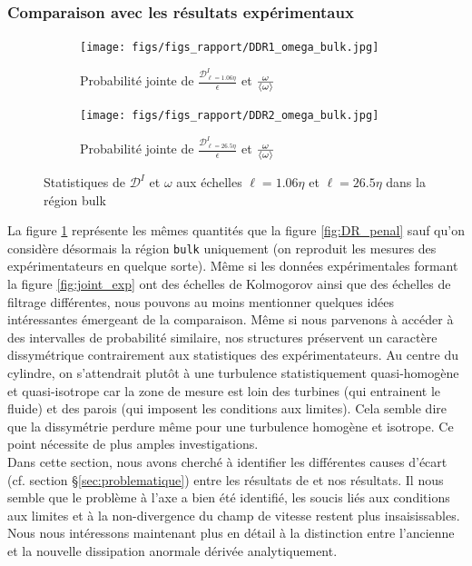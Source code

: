 \documentclass[13pt, a4paper]{extarticle}
\begin{document}
\subsubsection{Comparaison avec les résultats expérimentaux}\label{sec:res_exp} %
\begin{figure}[H]
  \centering
  \begin{subfigure}[b]{0.48\linewidth}
  \centering
  \texttt{[image: figs/figs\_rapport/DDR1\_omega\_bulk.jpg]}
  \caption{Probabilité jointe de $\frac{\mathscr{D}^I_{\ell=1.06\eta}}{\epsilon}$ 
  et $\frac{\omega}{\left\langle \omega\right\rangle}$}
  \end{subfigure}
  \begin{subfigure}[b]{0.48\linewidth}
    \centering
    \texttt{[image: figs/figs\_rapport/DDR2\_omega\_bulk.jpg]}
    \caption{Probabilité jointe de $\frac{\mathscr{D}^I_{\ell=26.5\eta}}{\epsilon}$ 
    et $\frac{\omega}{\left\langle \omega\right\rangle}$}
    \end{subfigure}
  \caption{Statistiques de $\mathscr{D}^I$ et $\omega$ aux échelles $\ell=1.06\eta$ 
  et $\ell=26.5\eta$
           dans la région bulk}
  \label{fig:DR_bulk}
\end{figure}
\noindent La figure \ref{fig:DR_bulk} représente les mêmes quantités que la figure 
\ref{fig:DR_penal} sauf qu'on considère désormais la région \texttt{bulk} uniquement 
(on reproduit les mesures des expérimentateurs en quelque sorte). Même si les données 
expérimentales formant la figure \ref{fig:joint_exp} ont des échelles de Kolmogorov 
ainsi que des échelles de filtrage différentes, nous pouvons au moins mentionner 
quelques idées intéressantes émergeant de la comparaison. Même si nous parvenons à 
accéder à des intervalles de probabilité similaire, nos structures préservent un 
caractère dissymétrique contrairement aux statistiques des expérimentateurs. Au 
centre du cylindre, on s'attendrait plutôt à une turbulence statistiquement 
quasi-homogène et quasi-isotrope car la zone de mesure est loin des turbines 
(qui entrainent le fluide) et des parois (qui imposent les conditions aux limites). 
Cela semble dire que la dissymétrie perdure même pour une turbulence homogène et 
isotrope. Ce point nécessite de plus amples investigations.\\

Dans cette section, nous avons cherché à identifier les différentes causes d'écart 
(cf. section \S \ref{sec:problematique}) entre les résultats de \cite{Faller-Intermittency} 
et nos résultats. Il nous semble que le problème à l'axe a bien été identifié, les 
soucis liés aux conditions aux limites et à la non-divergence du champ de vitesse 
restent plus insaisissables. Nous nous intéressons maintenant plus en détail à la 
distinction entre l'ancienne et la nouvelle dissipation anormale dérivée analytiquement.
\end{document}
